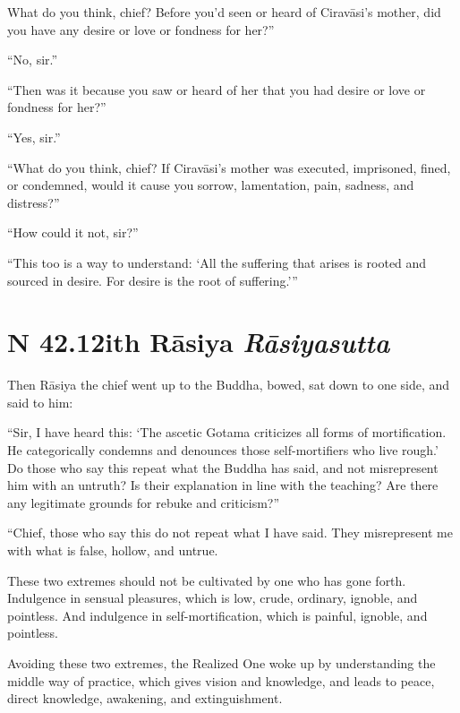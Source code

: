 \documentclass[12pt,openany]{book}%
\newcommand*{\suttatitleacronym}[1]{\smaller[2]{#1}\vspace*{.3em}}
\newcommand*{\suttatitletranslation}[1]{\linebreak{#1}}
\newcommand*{\suttatitleroot}[1]{\linebreak\smaller[2]\itshape{#1}}
\newcommand*{\tocacronym}[1]{\hspace*{-3.3em}{#1}\quad}
\newcommand*{\toctranslation}[1]{#1}
\newcommand*{\tocroot}[1]{(\textit{#1})}
\begin{document}
What do you think, chief? Before you’d seen or heard of \textsanskrit{Ciravāsi}’s mother, did you have any desire or love or fondness for her?” 

“No, sir.” 

“Then was it because you saw or heard of her that you had desire or love or fondness for her?” 

“Yes, sir.” 

“What do you think, chief? If \textsanskrit{Ciravāsi}’s mother was executed, imprisoned, fined, or condemned, would it cause you sorrow, lamentation, pain, sadness, and distress?” 

“How could it not, sir?” 

“This too is a way to understand: ‘All the suffering that arises is rooted and sourced in desire. For desire is the root of suffering.’” 

%
\section*{{\suttatitleacronym SN 42.12}{\suttatitletranslation With Rāsiya }{\suttatitleroot Rāsiyasutta}}
\addcontentsline{toc}{section}{\tocacronym{SN 42.12} \toctranslation{With Rāsiya } \tocroot{Rāsiyasutta}}

Then \textsanskrit{Rāsiya} the chief went up to the Buddha, bowed, sat down to one side, and said to him: 

“Sir, I have heard this: ‘The ascetic Gotama criticizes all forms of mortification. He categorically condemns and denounces those self-mortifiers who live rough.’ Do those who say this repeat what the Buddha has said, and not misrepresent him with an untruth? Is their explanation in line with the teaching? Are there any legitimate grounds for rebuke and criticism?” 

“Chief, those who say this do not repeat what I have said. They misrepresent me with what is false, hollow, and untrue. 

These two extremes should not be cultivated by one who has gone forth. Indulgence in sensual pleasures, which is low, crude, ordinary, ignoble, and pointless. And indulgence in self-mortification, which is painful, ignoble, and pointless. 

Avoiding these two extremes, the Realized One woke up by understanding the middle way of practice, which gives vision and knowledge, and leads to peace, direct knowledge, awakening, and extinguishment. 
\end{document}
